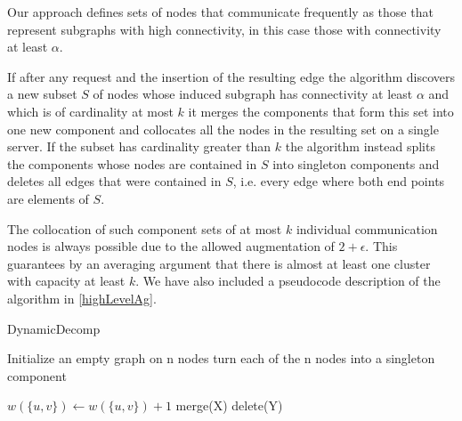 \documentclass[a4paper,xcolor=dvipsnames, tikz, 12pt]{article}
\newcommand{\nl}{\newline}
\theoremstyle{definition}
\begin{document}
	Our approach defines sets of nodes that communicate frequently as those that represent subgraphs with high connectivity, in this case those with connectivity at least $\alpha$.
	
	If after any request and the insertion of the resulting edge the algorithm discovers a new subset $S$ of nodes whose induced subgraph has connectivity at least $\alpha$ and which is of cardinality at most $k$ it merges the components that form this set into one new component and collocates all the nodes in the resulting set on a single server. If the subset has cardinality greater than $k$ the algorithm instead splits the components whose nodes are contained in $S$ into singleton components and deletes all edges that were contained in $S$, i.e. every edge where both end points are elements of $S$.
	
	The collocation of such component sets of at most $k$ individual communication nodes is always possible due to the allowed augmentation of $2+\epsilon$. This guarantees by an averaging argument that there is almost at least one cluster with capacity at least $k$. We have also included a pseudocode description of the algorithm in \cref{highLevelAg}.\nl\nl
	
	\begin{algorithm}
		\caption{DynamicDecomp}
		\label{highLevelAg}
		\begin{algorithmic}
			\STATE Initialize an empty graph on n nodes
			\STATE turn each of the n nodes into a singleton component
			
			\STATE $w(\{u,v\})\gets w(\{u,v\})+1$
			\ENDIF
			\STATE merge(X)
			\ENDIF
			\STATE delete(Y)
			\ENDIF	
			
			\ENDFOR
					
		\end{algorithmic}
	\end{algorithm}
	
\end{document}
